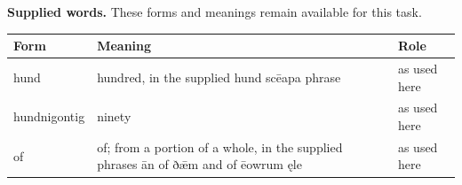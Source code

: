 \textbf{Supplied words.} These forms and meanings remain available for this task.

\par\begingroup
\fontsize{10.5}{13.2}\selectfont
\setlength{\LTleft}{0pt}\setlength{\LTright}{\fill}
\noindent
\begin{tabular}{@{}>{\raggedright\arraybackslash}p{22.44mm}>{\raggedright\arraybackslash}p{77.23mm}>{\raggedright\arraybackslash}p{18.7mm}@{}}
\toprule
\textbf{Form} & \textbf{Meaning} & \textbf{Role} \\
\midrule
hund & hundred, in the supplied hund scēapa phrase & as used here \\
hundnigontig & ninety & as used here \\
of & of; from a portion of a whole, in the supplied phrases ān of ðǣm and of ēowrum ęle & as used here \\
\bottomrule
\end{tabular}
\par\endgroup

